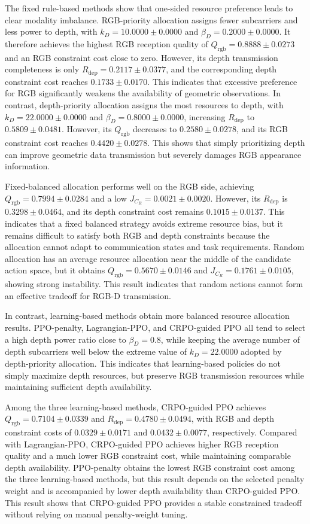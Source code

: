 \documentclass[journal]{IEEEtran}
\begin{document}
The fixed rule-based methods show that one-sided resource preference leads to clear modality imbalance. RGB-priority allocation assigns fewer subcarriers and less power to depth, with $k_D=10.0000\pm0.0000$ and $\beta_D=0.2000\pm0.0000$. It therefore achieves the highest RGB reception quality of $Q_{\mathrm{rgb}}=0.8888\pm0.0273$ and an RGB constraint cost close to zero. However, its depth transmission completeness is only $R_{\mathrm{dep}}=0.2117\pm0.0377$, and the corresponding depth constraint cost reaches $0.1733\pm0.0170$. This indicates that excessive preference for RGB significantly weakens the availability of geometric observations. In contrast, depth-priority allocation assigns the most resources to depth, with $k_D=22.0000\pm0.0000$ and $\beta_D=0.8000\pm0.0000$, increasing $R_{\mathrm{dep}}$ to $0.5809\pm0.0481$. However, its $Q_{\mathrm{rgb}}$ decreases to $0.2580\pm0.0278$, and its RGB constraint cost reaches $0.4420\pm0.0278$. This shows that simply prioritizing depth can improve geometric data transmission but severely damages RGB appearance information.

Fixed-balanced allocation performs well on the RGB side, achieving $Q_{\mathrm{rgb}}=0.7994\pm0.0284$ and a low $J_{C_R}=0.0021\pm0.0020$. However, its $R_{\mathrm{dep}}$ is $0.3298\pm0.0464$, and its depth constraint cost remains $0.1015\pm0.0137$. This indicates that a fixed balanced strategy avoids extreme resource bias, but it remains difficult to satisfy both RGB and depth constraints because the allocation cannot adapt to communication states and task requirements. Random allocation has an average resource allocation near the middle of the candidate action space, but it obtains $Q_{\mathrm{rgb}}=0.5670\pm0.0146$ and $J_{C_R}=0.1761\pm0.0105$, showing strong instability. This result indicates that random actions cannot form an effective tradeoff for RGB-D transmission.

In contrast, learning-based methods obtain more balanced resource allocation results. PPO-penalty, Lagrangian-PPO, and CRPO-guided PPO all tend to select a high depth power ratio close to $\beta_D=0.8$, while keeping the average number of depth subcarriers well below the extreme value of $k_D=22.0000$ adopted by depth-priority allocation. This indicates that learning-based policies do not simply maximize depth resources, but preserve RGB transmission resources while maintaining sufficient depth availability.

Among the three learning-based methods, CRPO-guided PPO achieves $Q_{\mathrm{rgb}}=0.7104\pm0.0339$ and $R_{\mathrm{dep}}=0.4780\pm0.0494$, with RGB and depth constraint costs of $0.0329\pm0.0171$ and $0.0432\pm0.0077$, respectively. Compared with Lagrangian-PPO, CRPO-guided PPO achieves higher RGB reception quality and a much lower RGB constraint cost, while maintaining comparable depth availability. PPO-penalty obtains the lowest RGB constraint cost among the three learning-based methods, but this result depends on the selected penalty weight and is accompanied by lower depth availability than CRPO-guided PPO. This result shows that CRPO-guided PPO provides a stable constrained tradeoff without relying on manual penalty-weight tuning.
\end{document}
